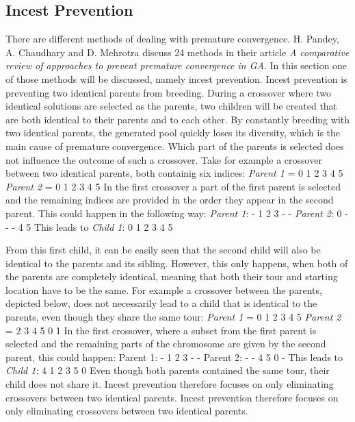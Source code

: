 \subsection{Incest Prevention}

\par
There are different methods of dealing with premature convergence. H. Pandey, A. Chaudhary and D. Mehrotra discuss 24 methods in their article \textit{A comparative review of approaches to prevent premature convergence in GA}\cite{Premconvergence}. In this section one of those methods will be discussed, namely incest prevention. Incest prevention is preventing two identical parents from breeding. During a crossover where two identical solutions are selected as the parents, two children will be created that are both identical to their parents and to each other. By constantly breeding with two identical parents, the generated pool quickly loses its diversity, which is the main cause of premature convergence. Which part of the parents is selected does not influence the outcome of such a crossover. Take for example a crossover between two identical parents, both containig six indices:
\newline
\textit{Parent 1} =  0 1 2 3 4 5 
\newline
\textit{Parent 2} =  0 1 2 3 4 5 
\newline
In the first crossover a part of the first parent is selected and the remaining indices are provided in the order they appear in the second parent. This could happen in the following way: 
\newline
\textit{Parent 1}: - 1 2 3 - -                 
\newline
\textit{Parent 2}: 0 - - - 4 5
\newline
This leads to \textit{Child 1}: 0 1 2 3 4 5

\par
From this first child, it can be easily seen that the second child will also be identical to the parents and its sibling. However, this only happens, when both of the parents are completely identical, meaning that both their tour and starting location have to be the same. For example a crossover between the parents, depicted below, does not necessarily lead to a child that is identical to the parents, even though they share the same tour:
\newline
\textit{Parent 1} =  0 1 2 3 4 5 
\textit{Parent 2} =  2 3 4 5 0 1 %
In the first crossover, where a subset from the first parent is selected and the remaining parts of the chromosome are given by the second parent, this could happen:
 \newline
Parent 1: - 1 2 3 - -                 
\newline
Parent 2: - - 4 5 0 -
\newline
This leads to \textit{Child 1}: 4 1 2 3 5 0
 \newline
Even though both parents contained the same tour, their child does not share it. Incest prevention therefore focuses on only eliminating crossovers between two identical parents. Incest prevention therefore focuses on only eliminating crossovers between two identical parents.

